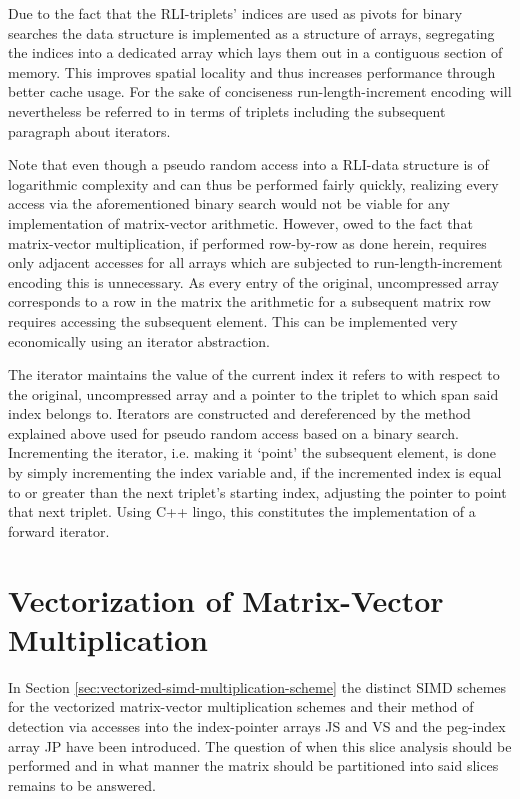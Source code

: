     Due to the fact that the RLI-triplets' indices are used as pivots for binary searches the data structure is
    implemented as a structure of arrays, segregating the indices into a dedicated array which lays them out in a
    contiguous section of memory. This improves spatial locality and thus increases performance through better cache
    usage. For the sake of conciseness run-length-increment encoding will nevertheless be referred to in terms of
    triplets including the subsequent paragraph about iterators.

    Note that even though a pseudo random access into a RLI-data structure is of logarithmic complexity and can thus be
    performed fairly quickly, realizing every access via the aforementioned binary search would not be viable for any
    implementation of matrix-vector arithmetic. However, owed to the fact that matrix-vector multiplication, if
    performed row-by-row as done herein, requires only adjacent accesses for all arrays which are subjected to
    run-length-increment encoding this is unnecessary. As every entry of the original, uncompressed array corresponds
    to a row in the matrix the arithmetic for a subsequent matrix row requires accessing the subsequent element. This
    can be implemented very economically using an iterator abstraction.

    The iterator maintains the value of the current index it refers to with respect to the original, uncompressed array
    and a pointer to the triplet to which span said index belongs to. Iterators are constructed and dereferenced by the
    method explained above used for pseudo random access based on a binary search. Incrementing the iterator, i.e.
    making it `point' the subsequent element, is done by simply incrementing the index variable and, if the incremented
    index is equal to or greater than the next triplet's starting index, adjusting the pointer to point that next
    triplet. Using C++ lingo, this constitutes the implementation of a forward iterator.

  \section{Vectorization of Matrix-Vector Multiplication} \label{sec:vectorization-of-mvm}

    In Section \ref{sec:vectorized-simd-multiplication-scheme} the distinct SIMD schemes for the vectorized
    matrix-vector multiplication schemes and their method of detection via accesses into the index-pointer arrays JS
    and VS and the peg-index array JP have been introduced. The question of when this slice analysis should be
    performed and in what manner the matrix should be partitioned into said slices remains to be answered.

